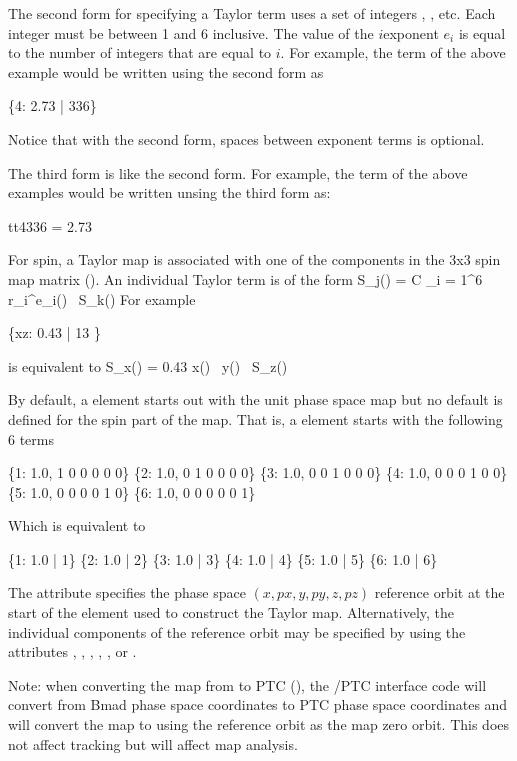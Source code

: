 {The second form for specifying a Taylor term uses a set of integers ,
, etc. Each integer must be between 1 and 6 inclusive. The value of 
the $i$\Th exponent $e_i$ is equal to the number of integers that are equal
to $i$. For example, the term of the above example would be written using
the second form as
\begin{example}
  \{4: 2.73 | 336\}
\end{example}
Notice that with the second form, spaces between exponent terms is optional.

The third form is like the second form. For example, the term of the above examples
would be written unsing the third form as:
\begin{example}
  tt4336 = 2.73
\end{example}

For spin, a Taylor map is associated with one of the components in the
3x3 spin map matrix (). An individual Taylor term is
of the form
\Begineq
  S_j(\Out) = C \cdot \Pi_{i = 1}^6 \, \delta r_i^{e_i}(\In) \, S_k(\In)
\Endeq
For example
\begin{example}
  \{xz: 0.43 | 13 \}
\end{example}
is equivalent to
\Begineq
  S_x(\Out) = 0.43 \cdot \delta x(\In) \, \delta y(\In) \, S_z(\In)
\Endeq

By default, a  element starts out with the unit phase space map but no default
is defined for the spin part of the map.  That is, a  element starts with the
following 6 terms
\begin{example}
  \{1: 1.0, 1 0 0 0 0 0\}
  \{2: 1.0, 0 1 0 0 0 0\}
  \{3: 1.0, 0 0 1 0 0 0\}
  \{4: 1.0, 0 0 0 1 0 0\}
  \{5: 1.0, 0 0 0 0 1 0\}
  \{6: 1.0, 0 0 0 0 0 1\}
\end{example}
Which is equivalent to
\begin{example}
  \{1: 1.0 | 1\}
  \{2: 1.0 | 2\}
  \{3: 1.0 | 3\}
  \{4: 1.0 | 4\}
  \{5: 1.0 | 5\}
  \{6: 1.0 | 6\}
\end{example}

The  attribute specifies the phase space $(x, px, y, py, z, pz)$ reference
orbit at the start of the element used to construct the Taylor map. Alternatively, the
individual components of the reference orbit may be specified by using the attributes 
, , , , , or .

Note: when converting the map from \bmad to PTC (), the \bmad/PTC interface
code will convert from Bmad phase space coordinates to PTC phase space coordinates and
will convert the map to using the reference orbit as the map zero orbit. This does not
affect tracking but will affect map analysis.

}
